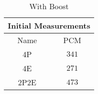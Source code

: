 \begin{table}[H]
    \centering
    \begin{tabular}{|| c | c ||}
    \hline
    \multicolumn{2}{||c||}{Initial Measurements} \\ [0.5ex] \hline\hline
    Name & PCM \\\hline
    4P & $341$ \\
    4E & $271$ \\
    2P2E& $473$ \\\hline
    \end{tabular}
    \caption{With Boost}
    \label{tab:initial-measurements-bonus}
\end{table}